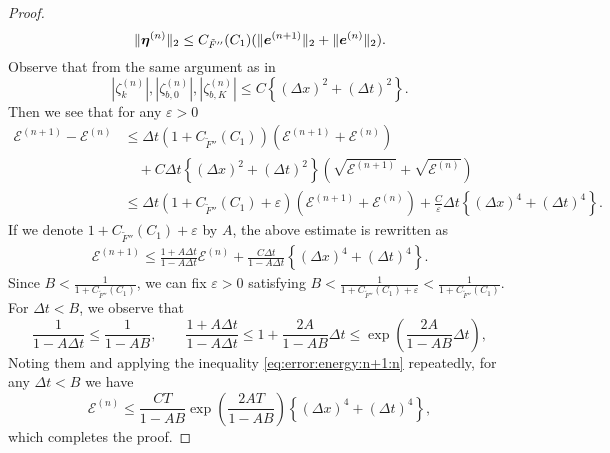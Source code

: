 \documentclass[dvipdfmx-if-dvi,autodetect-engine,ja=standard]{amsart}
\numberwithin{equation}{section} %
\def\vect#1{\mbox{\boldmath $#1$}} %
\begin{document}
\begin{proof}
\[
\| \vect{\eta}^{(n)} \|_2 \leq C_{\tilde{F}''}(C_1) (\| \vect{e}^{(n+1)} \|_2 + \| \vect{e}^{(n)} \|_2). 
\]
Observe that from the same argument as in \cite{5} 
\[
|\zeta_k^{(n)}|, |\zeta_{b,0}^{(n)}|, |\zeta_{b,K}^{(n)}| 
\leq C\left\{ (\Delta x)^2 + (\Delta t)^2 \right\}. 
\]
Then we see that for any $\varepsilon>0$
\begin{align*}
    \mathcal{E}^{(n+1)} - \mathcal{E}^{(n)} 
    &\leq \Delta t (1+  C_{\tilde{F}''}(C_1) ) (\mathcal{E}^{(n+1)} + \mathcal{E}^{(n)}) \\
    &\quad  + C \Delta t \left\{ (\Delta x)^2 + (\Delta t)^2 \right\} (\sqrt{\mathcal{E}^{(n+1)}} + \sqrt{\mathcal{E}^{(n)}} ) \\ 
&\leq \Delta t (1+  C_{\tilde{F}''}(C_1) + \varepsilon) (\mathcal{E}^{(n+1)} + \mathcal{E}^{(n)}) 
 + \frac{C}{\varepsilon} \Delta t \left\{ (\Delta x)^4 + (\Delta t)^4 \right\}. 
\end{align*}
If we denote $1+  C_{\tilde{F}''}(C_1) + \varepsilon$ by $A$, the above estimate is rewritten as 
\begin{align}\label{eq:error:energy:n+1:n}
    \mathcal{E}^{(n+1)} \leq \frac{1 + A \Delta t}{1 - A\Delta t} \mathcal{E}^{(n)} + \frac{C \Delta t}{1- A\Delta t} \left\{ (\Delta x)^4 + (\Delta t)^4 \right\}. 
\end{align}
Since $B< \frac{1}{1+C_{\tilde{F}''}(C_1) }$, we can fix $\varepsilon > 0$ satisfying $B< \frac{1}{1+ C_{\tilde{F}''}(C_1) + \varepsilon} < \frac{1}{1+C_{\tilde{F}''}(C_1) }$. 
For $\Delta t < B$, we observe that 
\[
\frac{1}{1 - A\Delta t} \leq \frac{1}{1 - AB}, 
\qquad \frac{1 + A \Delta t}{1 - A\Delta t} \leq 1 + \frac{2A}{1 -A B} \Delta t \leq \exp \left( \frac{2A}{1 -A B} \Delta t \right), 
\]
Noting them and applying the inequality
\eqref{eq:error:energy:n+1:n}
repeatedly,
for any
$\Delta t < B$
we have
\[
\mathcal{E}^{(n)} \leq \frac{CT}{1 -A B} \exp \left( \frac{2AT}{1 -A B} \right) \left\{ (\Delta x)^4 + (\Delta t)^4 \right\}, 
\]
which completes the proof. 
\end{proof}














\end{document}

